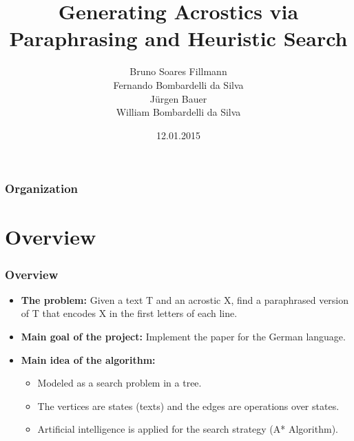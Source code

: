 \documentclass{beamer}
\title[Generating Acrostics via Paraphrasing and Heuristic Search]{Generating Acrostics via Paraphrasing and Heuristic Search} %
\author[Bruno, Fernando, Jürgen, William]{Bruno Soares Fillmann\\
Fernando Bombardelli da Silva\\
Jürgen Bauer\\
William Bombardelli da Silva
} %
\institute[TU Berlin] %
{
Technische Universität Berlin \\ %
Datenbanksysteme und Informationsmanagement \\
DBPRO – Database Projects (WS 2014/2015) \\
\medskip
}
\date{12.01.2015} %
\begin{document}
\begin{frame}
\titlepage %
\end{frame}

\begin{frame}
\frametitle{Organization} %
\tableofcontents %
\end{frame}


\section{Overview} %


\begin{frame}
\frametitle{Overview}
\begin{itemize}
\item \textbf{The problem:} Given a text T and an acrostic X, find a paraphrased version of T that encodes X in the first letters of each line.
\item \textbf{Main goal of the project:} Implement the paper for the German language.
\item \textbf{Main idea of the algorithm:}
	\begin{itemize}
	\item Modeled as a search problem in a tree.
	\item The vertices are states (texts) and the edges are operations over states.
	\item Artificial intelligence is applied for the search strategy (A* Algorithm).
	\end{itemize}
\end{itemize}
\end{frame}
\end{document}
